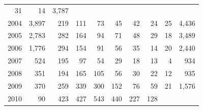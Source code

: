 \begin{table}[!h]
\begin{tabular}{llllllllll}
  \multicolumn{1}{r}{31} &
  \multicolumn{1}{r}{14} &
  \multicolumn{1}{r}{3,787} \\
\multicolumn{1}{l}{\hspace{1em}2004} &
  \multicolumn{1}{|r}{3,897} &
  \multicolumn{1}{r}{219} &
  \multicolumn{1}{r}{111} &
  \multicolumn{1}{r}{73} &
  \multicolumn{1}{r}{45} &
  \multicolumn{1}{r}{42} &
  \multicolumn{1}{r}{24} &
  \multicolumn{1}{r}{25} &
  \multicolumn{1}{r}{4,436} \\
\multicolumn{1}{l}{\hspace{1em}2005} &
  \multicolumn{1}{|r}{2,783} &
  \multicolumn{1}{r}{282} &
  \multicolumn{1}{r}{164} &
  \multicolumn{1}{r}{94} &
  \multicolumn{1}{r}{71} &
  \multicolumn{1}{r}{48} &
  \multicolumn{1}{r}{29} &
  \multicolumn{1}{r}{18} &
  \multicolumn{1}{r}{3,489} \\
\multicolumn{1}{l}{\hspace{1em}2006} &
  \multicolumn{1}{|r}{1,776} &
  \multicolumn{1}{r}{294} &
  \multicolumn{1}{r}{154} &
  \multicolumn{1}{r}{91} &
  \multicolumn{1}{r}{56} &
  \multicolumn{1}{r}{35} &
  \multicolumn{1}{r}{14} &
  \multicolumn{1}{r}{20} &
  \multicolumn{1}{r}{2,440} \\
\multicolumn{1}{l}{\hspace{1em}2007} &
  \multicolumn{1}{|r}{524} &
  \multicolumn{1}{r}{195} &
  \multicolumn{1}{r}{97} &
  \multicolumn{1}{r}{54} &
  \multicolumn{1}{r}{29} &
  \multicolumn{1}{r}{18} &
  \multicolumn{1}{r}{13} &
  \multicolumn{1}{r}{4} &
  \multicolumn{1}{r}{934} \\
\multicolumn{1}{l}{\hspace{1em}2008} &
  \multicolumn{1}{|r}{351} &
  \multicolumn{1}{r}{194} &
  \multicolumn{1}{r}{165} &
  \multicolumn{1}{r}{105} &
  \multicolumn{1}{r}{56} &
  \multicolumn{1}{r}{30} &
  \multicolumn{1}{r}{22} &
  \multicolumn{1}{r}{12} &
  \multicolumn{1}{r}{935} \\
\multicolumn{1}{l}{\hspace{1em}2009} &
  \multicolumn{1}{|r}{370} &
  \multicolumn{1}{r}{259} &
  \multicolumn{1}{r}{339} &
  \multicolumn{1}{r}{300} &
  \multicolumn{1}{r}{152} &
  \multicolumn{1}{r}{76} &
  \multicolumn{1}{r}{59} &
  \multicolumn{1}{r}{21} &
  \multicolumn{1}{r}{1,576} \\
\multicolumn{1}{l}{\hspace{1em}2010} &
  \multicolumn{1}{|r}{90} &
  \multicolumn{1}{r}{423} &
  \multicolumn{1}{r}{427} &
  \multicolumn{1}{r}{543} &
  \multicolumn{1}{r}{440} &
  \multicolumn{1}{r}{227} &
  \multicolumn{1}{r}{128} &

\end{tabular}
\end{table}
